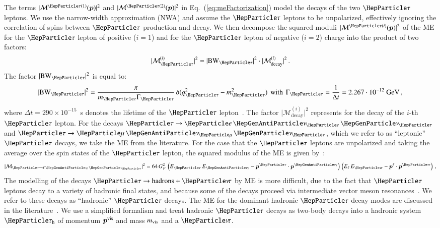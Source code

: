 The terms $\vert \mathcal{M}^{\Pgt(1)}(\bm{p}) \vert^{2}$ and $\vert
\mathcal{M}^{\Pgt(2)}(\bm{p}) \vert^{2}$ in Eq.~(\ref{eq:meFactorization}) model the decays of the two $\Pgt$ leptons.
We use the narrow-width approximation (NWA) and assume the $\Pgt$ leptons to be unpolarized,
effectively ignoring the correlation of spins between $\Pgt$ production and decay.
We then decompose the squared moduli $\vert
\mathcal{M}^{\Pgt(i)}(\bm{p}) \vert^{2}$ of the ME for the $\Pgt$ lepton of positive ($i=1$) and
for the $\Pgt$ lepton of negative ($i=2$) charge into the product of two factors:
\begin{equation}
\vert \mathcal{M}^{(i)}_{\Pgt} \vert^{2} = \vert \BW_{\Pgt} \vert^{2} \cdot \vert \mathcal{M}^{(i)}_{\textrm{decay}} \vert^{2} \, .
\end{equation}
The factor $\vert \BW_{\Pgt} \vert^{2}$ is equal to:
\begin{equation}
\vert \BW_{\Pgt} \vert^{2} = \frac{\pi}{m_{\Pgt}\Gamma_{\Pgt}} \,
\delta ( q_{\Pgt}^{2} - m_{\Pgt}^{2} ) \, \mbox{ with } \, 
\Gamma_{\Pgt} = \frac{1}{\Delta t} =
 2.267 \cdot 10^{-12}\textrm{~\GeV} \, ,
\end{equation}
where $\Delta t = 290 \times 10^{-15}$~s denotes the lifetime of the
$\Pgt$ lepton~\cite{PDG}.
The factor $\vert \mathcal{M}^{(i)}_{\textrm{decay}}
\vert^{2}$ represents for the decay of the $i$-th $\Pgt$ lepton.
For the decays $\Pgt \to \enunu$ and $\Pgt
\to \mununu$, which we refer to as ``leptonic'' $\Pgt$ decays, we take the ME from the literature.
For the case that the $\Pgt$ leptons are unpolarized and taking the average over the spin states of the $\Pgt$ lepton,
the squared modulus of the ME is given by~\cite{Barger:1987nn}:
\begin{equation}
\vert\mathcal{M}_{\Pgt \to \ellnunu} \vert^{2} = 64 \, G^{2}_{F} \,
\left( E_{\Pgt} \, E_{\APnu_{\Plepton}} - \bm{p}^{\Pgt} \cdot
  \bm{p}^{\APnu_{\Plepton}} \right) \, \left( E_{\Plepton} \,
  E_{\Pnut} - \bm{p}^{\Plepton} \cdot \bm{p}^{\Pnut} \right) \, , 
\label{eq:leptonic_tau_decays_ME}
\end{equation}
The modelling of the decays $\Pgt \to \textrm{hadrons} + \Pnut$ 
by ME is more difficult, 
due to the fact that $\Pgt$ leptons decay to a variety of hadronic
final states, and because some of the decays proceed via intermediate vector
meson resonances~\cite{PDG}.
We refer to these decays as ``hadronic'' $\Pgt$ decays.
The ME for the dominant hadronic $\Pgt$ decay modes are discussed in the literature~\cite{Bullock:1992yt,Raychaudhuri:1995kv}.
We use a simplified formalism and treat hadronic $\Pgt$ decays as two-body decays into a hadronic system $\tauh$ of momentum $\bm{p}^{\textrm{vis}}$ and mass $m_{\textrm{vis}}$ and a $\Pnut$.
